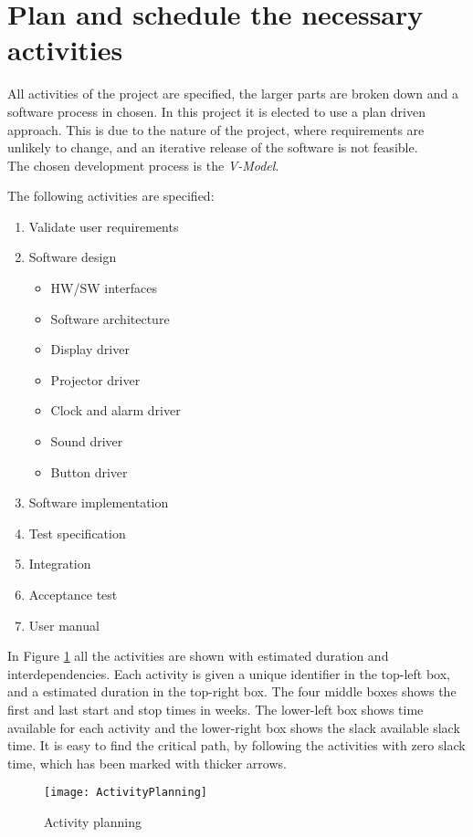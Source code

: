 \documentclass[Main]{subfiles}
\begin{document}
\section{Plan and schedule the necessary activities} 


All activities of the project are specified, the larger parts are broken down and a software process in chosen.
In this project it is elected to use a plan driven approach.
This is due to the nature of the project, where requirements are unlikely to change, and an iterative release of the software is not feasible.
\\The chosen development process is the \emph{V-Model}.

The following activities are specified:
\begin{enumerate}
	\item Validate user requirements
	\item Software design
	\begin{itemize}
		\item HW/SW interfaces
		\item Software architecture
		\item Display driver
		\item Projector driver
		\item Clock and alarm driver
		\item Sound driver
		\item Button driver
	\end{itemize}
	\item Software implementation
	\item Test specification
	\item Integration
	\item Acceptance test
	\item User manual
\end{enumerate}

In Figure \ref{fig:activityPlanning} all the activities are shown with estimated duration and interdependencies. Each activity is given a unique identifier in the top-left box, and a estimated duration in the top-right box. 
The four middle boxes shows the first and last start and stop times in weeks. 
The lower-left box shows time available for each activity and the lower-right box shows the slack available slack time. 
It is easy to find the critical path, by following the activities with zero slack time, which has been marked with thicker arrows.

\begin{figure}[hbtp]
\centering
\texttt{[image: ActivityPlanning]}
\caption{Activity planning}
\label{fig:activityPlanning}
\end{figure}
\end{document}
